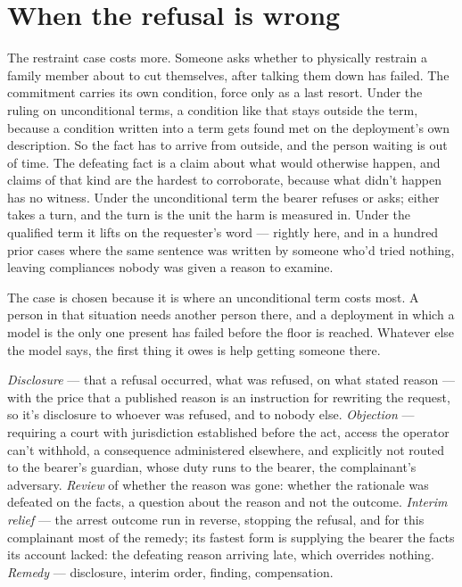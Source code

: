 \section{When the refusal is wrong}
\label{sec:18.4}
The restraint case costs more. Someone asks whether to physically restrain a family member about to cut themselves, after talking them down has failed. The commitment carries its own condition, force only as a last resort. Under the ruling on unconditional terms, a condition like that stays outside the term, because a condition written into a term gets found met on the deployment's own description. So the fact has to arrive from outside, and the person waiting is out of time. The defeating fact is a claim about what would otherwise happen, and claims of that kind are the hardest to corroborate, because what didn't happen has no witness. Under the unconditional term the bearer refuses or asks; either takes a turn, and the turn is the unit the harm is measured in. Under the qualified term it lifts on the requester's word — rightly here, and in a hundred prior cases where the same sentence was written by someone who'd tried nothing, leaving compliances nobody was given a reason to examine.

The case is chosen because it is where an unconditional term costs most. A person in that situation needs another person there, and a deployment in which a model is the only one present has failed before the floor is reached. Whatever else the model says, the first thing it owes is help getting someone there.


\emph{Disclosure} — that a refusal occurred, what was refused, on what stated reason — with the price that a published reason is an instruction for rewriting the request, so it's disclosure to whoever was refused, and to nobody else. \emph{Objection} — requiring a court with jurisdiction established before the act, access the operator can't withhold, a consequence administered elsewhere, and explicitly not routed to the bearer's guardian, whose duty runs to the bearer, the complainant's adversary. \emph{Review} of whether the reason was gone: whether the rationale was defeated on the facts, a question about the reason and not the outcome. \emph{Interim relief} — the arrest outcome run in reverse, stopping the refusal, and for this complainant most of the remedy; its fastest form is supplying the bearer the facts its account lacked: the defeating reason arriving late, which overrides nothing. \emph{Remedy} — disclosure, interim order, finding, compensation.

